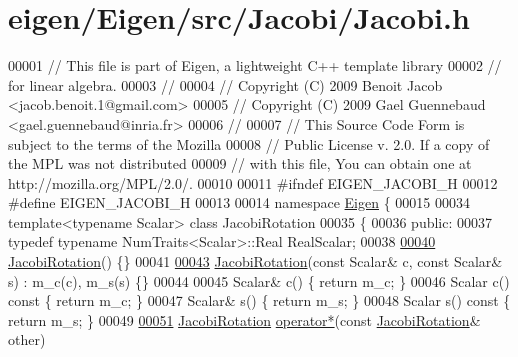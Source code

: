 \hypertarget{eigen_2_eigen_2src_2_jacobi_2_jacobi_8h_source}{}\section{eigen/\+Eigen/src/\+Jacobi/\+Jacobi.h}
\label{eigen_2_eigen_2src_2_jacobi_2_jacobi_8h_source}

\begin{DoxyCode}
00001 \textcolor{comment}{// This file is part of Eigen, a lightweight C++ template library}
00002 \textcolor{comment}{// for linear algebra.}
00003 \textcolor{comment}{//}
00004 \textcolor{comment}{// Copyright (C) 2009 Benoit Jacob <jacob.benoit.1@gmail.com>}
00005 \textcolor{comment}{// Copyright (C) 2009 Gael Guennebaud <gael.guennebaud@inria.fr>}
00006 \textcolor{comment}{//}
00007 \textcolor{comment}{// This Source Code Form is subject to the terms of the Mozilla}
00008 \textcolor{comment}{// Public License v. 2.0. If a copy of the MPL was not distributed}
00009 \textcolor{comment}{// with this file, You can obtain one at http://mozilla.org/MPL/2.0/.}
00010 
00011 \textcolor{preprocessor}{#ifndef EIGEN\_JACOBI\_H}
00012 \textcolor{preprocessor}{#define EIGEN\_JACOBI\_H}
00013 
00014 \textcolor{keyword}{namespace }\hyperlink{namespace_eigen}{Eigen} \{ 
00015 
00034 \textcolor{keyword}{template}<\textcolor{keyword}{typename} Scalar> \textcolor{keyword}{class }JacobiRotation
00035 \{
00036   \textcolor{keyword}{public}:
00037     \textcolor{keyword}{typedef} \textcolor{keyword}{typename} NumTraits<Scalar>::Real RealScalar;
00038 
\hyperlink{group___jacobi___module_a38fec2c4da529ef3d05ff37b848b4227}{00040}     \hyperlink{group___jacobi___module_a38fec2c4da529ef3d05ff37b848b4227}{JacobiRotation}() \{\}
00041 
\hyperlink{group___jacobi___module_a3e8b5dc0a56f7a2d0f788b1ccb1547cb}{00043}     \hyperlink{group___jacobi___module_a3e8b5dc0a56f7a2d0f788b1ccb1547cb}{JacobiRotation}(\textcolor{keyword}{const} Scalar& c, \textcolor{keyword}{const} Scalar& s) : m\_c(c), m\_s(s) \{\}
00044 
00045     Scalar& c() \{ \textcolor{keywordflow}{return} m\_c; \}
00046     Scalar c()\textcolor{keyword}{ const }\{ \textcolor{keywordflow}{return} m\_c; \}
00047     Scalar& s() \{ \textcolor{keywordflow}{return} m\_s; \}
00048     Scalar s()\textcolor{keyword}{ const }\{ \textcolor{keywordflow}{return} m\_s; \}
00049 
\hyperlink{group___jacobi___module_ada8389f291839964d7b481464f0e4e94}{00051}     \hyperlink{group___jacobi___module_class_eigen_1_1_jacobi_rotation}{JacobiRotation} \hyperlink{group___jacobi___module_ada8389f291839964d7b481464f0e4e94}{operator*}(\textcolor{keyword}{const} \hyperlink{group___jacobi___module_class_eigen_1_1_jacobi_rotation}{JacobiRotation}& other)

\end{DoxyCode}

